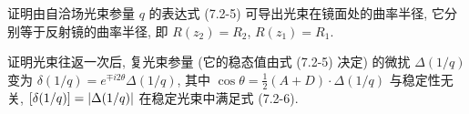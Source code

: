 \documentclass{note}
\begin{document}
\begin{exe}
    证明由自洽场光束参量 $q$ 的表达式 (7.2-5) 可导出光束在镜面处的曲率半径, 它分别等于反射镜的曲率半径, 即 $R(z_2)=R_2$, $R(z_1)=R_1$.
\end{exe}
\begin{pf}
    
\end{pf}

\begin{exe}
    证明光束往返一次后, 复光束参量 (它的稳态值由式 (7.2-5) 决定) 的微扰 $\Delta(1/q)$ 变为 $\delta(1/q)=e^{\mp i2\theta}\Delta(1/q)$, 其中 $\cos\theta=\frac{1}{2}(A+D)\cdot\Delta(1/q)$ 与稳定性无关, $[\delta(1/q)]=\left\lvert\Delta(1/q)\right\rvert$ 在稳定光束中满足式 (7.2-6).
\end{exe}
\begin{pf}
    
\end{pf}
\ifx\allfiles\undefined
\end{document}
